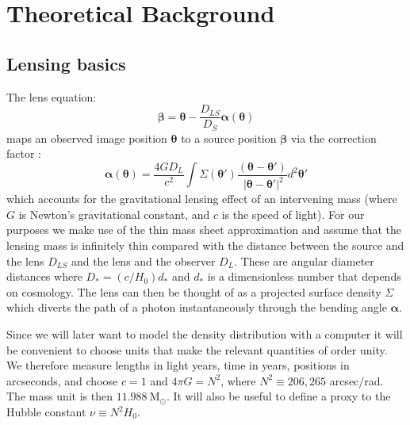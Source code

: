 \documentclass[galley]{mn2e}
\newcommand{\Msun}{\ensuremath{\mathrm{M}_\odot}}
\renewcommand{\vec}[1]{\ensuremath{\boldsymbol{#1}}}
\begin{document}
\section{Theoretical Background}\label{sec:theory} %

\subsection{Lensing basics}\label{sec:lensing_basic} %

The lens equation:
%
\begin{equation}
\vec\beta = \vec\theta - \frac{D_{LS}}{D_S}\vec\alpha(\vec\theta)
\label{eqn:lens_equation}
\end{equation}
%
maps an observed image position $\vec\theta$ to a source position $\vec\beta$
via the correction factor \citep[e.g.][]{1992grle.book.....S}:
%
\begin{equation}
\vec\alpha(\vec\theta) = \frac{4GD_L}{c^2} \int \Sigma(\vec\theta')\frac{(\vec\theta - \vec\theta')}{\ |\vec\theta - \vec\theta'|^2}d^2\vec\theta'
\end{equation}
%
which accounts for the gravitational lensing effect of an intervening mass (where $G$ is Newton's gravitational constant, and $c$ is the speed of light). For
our purposes we make use of the thin mass sheet approximation and assume that
the lensing mass is infinitely thin compared with the distance between the
source and the lens $D_{LS}$ and the lens and the observer $D_{L}$. These are angular diameter distances where $D_* = (c/H_0)d_*$ and $d_*$ is
a dimensionless number that depends on cosmology.  The lens can then be thought
of as a projected surface density $\Sigma$ which diverts the path of a photon
instantaneously through the bending angle $\vec\alpha$.

Since we will later want to model the density distribution with a computer it will
be convenient to choose units that make the relevant quantities of order unity.
We therefore measure lengths in light years, time in years, positions in
arcseconds, and choose $c=1$ and $4\pi G = N^2$, where $N^2 \equiv 206,265$
arcsec/rad. The mass unit is then $11.988\ \Msun$. It will also be useful to 
define a proxy to the Hubble constant $\nu \equiv N^2 H_0$.
\end{document}
